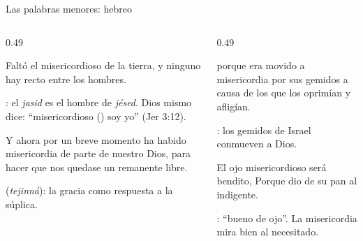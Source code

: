 \begin{frame}{Las palabras menores: hebreo}
\begin{columns}[t,onlytextwidth]
\begin{column}{0.49\textwidth}
\begin{cita}Faltó el misericordioso de la tierra, y ninguno hay recto entre los hombres.\end{cita}
\scriptsize{}: el \emph{jasid} es el hombre de \emph{jésed}. Dios mismo dice: ``misericordioso () soy yo'' (Jer 3:12).
\begin{cita}Y ahora por un breve momento ha habido misericordia de parte de \SENOR{} nuestro Dios, para hacer que nos quedase un remanente libre.\end{cita}
\scriptsize{} (\emph{tejinná}): la gracia como respuesta a la súplica.
\end{column}
\begin{column}{0.49\textwidth}
\begin{cita}porque \SENOR{} era movido a misericordia por sus gemidos a causa de los que los oprimían y afligían.\end{cita}
\scriptsize{}: los gemidos de Israel conmueven a Dios.
\begin{cita}El ojo misericordioso será bendito, Porque dio de su pan al indigente.\end{cita}
\scriptsize{}: ``bueno de ojo''. La misericordia mira bien al necesitado.
\end{column}
\end{columns}
\end{frame}

